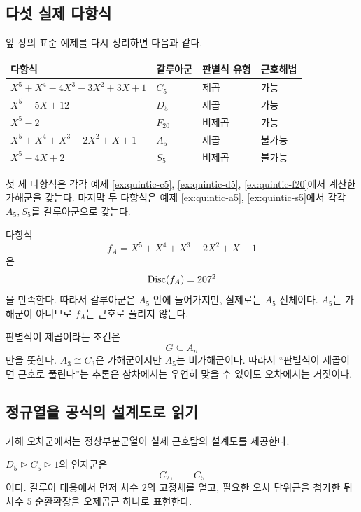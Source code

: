 \subsection{다섯 실제 다항식}

앞 장의 표준 예제를 다시 정리하면 다음과 같다.

\begin{center}
\small
\renewcommand{\arraystretch}{1.2}
\begin{tabular}{p{}lll}
\toprule
다항식 & 갈루아군 & 판별식 유형 & 근호해법 \\
\midrule
$X^5+X^4-4X^3-3X^2+3X+1$ & $C_5$ & 제곱 & 가능 \\
$X^5-5X+12$ & $D_5$ & 제곱 & 가능 \\
$X^5-2$ & $F_{20}$ & 비제곱 & 가능 \\
$X^5+X^4+X^3-2X^2+X+1$ & $A_5$ & 제곱 & 불가능 \\
$X^5-4X+2$ & $S_5$ & 비제곱 & 불가능 \\
\bottomrule
\end{tabular}
\end{center}

첫 세 다항식은 각각 예제 \ref{ex:quintic-c5}, \ref{ex:quintic-d5}, \ref{ex:quintic-f20}에서 계산한 가해군을 갖는다. 마지막 두 다항식은 예제 \ref{ex:quintic-a5}, \ref{ex:quintic-s5}에서 각각 $A_5,S_5$를 갈루아군으로 갖는다.

\begin{example}
다항식
\[
  f_A=X^5+X^4+X^3-2X^2+X+1
\]
은
\[
  \operatorname{Disc}(f_A)=207^2
\]
을 만족한다. 따라서 갈루아군은 $A_5$ 안에 들어가지만, 실제로는 $A_5$ 전체이다. $A_5$는 가해군이 아니므로 $f_A$는 근호로 풀리지 않는다.
\end{example}

\begin{pitfall}
판별식이 제곱이라는 조건은
\[
  G\subseteq A_n
\]
만을 뜻한다. $A_3\cong C_3$은 가해군이지만 $A_5$는 비가해군이다. 따라서 ``판별식이 제곱이면 근호로 풀린다''는 추론은 삼차에서는 우연히 맞을 수 있어도 오차에서는 거짓이다.
\end{pitfall}

\subsection{정규열을 공식의 설계도로 읽기}

가해 오차군에서는 정상부분군열이 실제 근호탑의 설계도를 제공한다.

\begin{example}[$D_5$의 두 단계]
$D_5\trianglerighteq C_5\trianglerighteq1$의 인자군은
\[
  C_2,\qquad C_5
\]
이다. 갈루아 대응에서 먼저 차수 $2$의 고정체를 얻고, 필요한 오차 단위근을 첨가한 뒤 차수 $5$ 순환확장을 오제곱근 하나로 표현한다.
\end{example}

